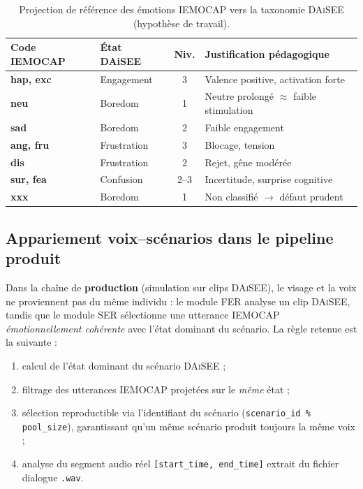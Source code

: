 \begin{table}[H]
\centering
\renewcommand{\arraystretch}{1.15}
\begin{tabular}{>{\bfseries}l l c p{4.8cm}}
\toprule
Code IEMOCAP & État DAiSEE & Niv. & Justification pédagogique \\
\midrule
hap, exc & Engagement  & 3 & Valence positive, activation forte \\
neu      & Boredom     & 1 & Neutre prolongé $\approx$ faible stimulation \\
sad      & Boredom     & 2 & Faible engagement \\
ang, fru & Frustration & 3 & Blocage, tension \\
dis      & Frustration & 2 & Rejet, gêne modérée \\
sur, fea & Confusion   & 2--3 & Incertitude, surprise cognitive \\
xxx      & Boredom     & 1 & Non classifié $\rightarrow$ défaut prudent \\
\bottomrule
\end{tabular}
\caption{Projection de référence des émotions \textsc{IEMOCAP} vers la taxonomie
\textsc{DAiSEE} (hypothèse de travail).}
\label{tab:mapping-iemocap}
\end{table}

\subsection{Appariement voix--scénarios dans le pipeline produit}
\label{subsec:appariement}

Dans la chaîne de \textbf{production} (simulation sur clips \textsc{DAiSEE}), le
visage et la voix ne proviennent pas du même individu : le module FER analyse un
clip \textsc{DAiSEE}, tandis que le module SER sélectionne une utterance
\textsc{IEMOCAP} \emph{émotionnellement cohérente} avec l'état dominant du
scénario. La règle retenue est la suivante :
\begin{enumerate}[label=\textbf{\arabic*.}, leftmargin=1.6em]
  \item calcul de l'état dominant du scénario \textsc{DAiSEE} ;
  \item filtrage des utterances \textsc{IEMOCAP} projetées sur le \emph{même} état ;
  \item sélection reproductible via l'identifiant du scénario
        (\texttt{scenario\_id \% pool\_size}), garantissant qu'un même scénario
        produit toujours la même voix ;
  \item analyse du segment audio réel \texttt{[start\_time, end\_time]} extrait
        du fichier dialogue \texttt{.wav}.
\end{enumerate}


